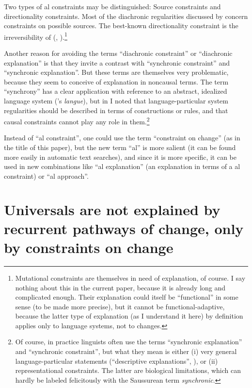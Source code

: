 \documentclass[output=paper]{langsci/langscibook}
\begin{document}
Two types of al constraints may be distinguished: Source constraints and directionality constraints. Most of the diachronic regularities discussed by \citet{Cristofaro2017} concern constraints on possible sources. The best-known directionality constraint is the irreversibility of  (\citealt{Haspelmath1999_Irrev}, \citeyear*{ Haspelmath2004_Direction}).\footnote{Mutational constraints 
\label{fn:haspelmath:mutationalconstraints}
are themselves in need of explanation, of course. I say nothing about this in the current paper, because it is already long and complicated enough. Their explanation could itself be “functional” in some sense (to be made more precise), but it cannot be functional-adaptive, because the latter type of explanation (as I understand it here) by definition applies only to language systems, not to changes.} 

Another reason for avoiding the terms “diachronic constraint” or “diachronic explanation” is that they invite a contrast with “synchronic constraint” and “synchronic explanation”. But these terms are themselves very problematic, because they seem to conceive of explanation in noncausal terms. The term “synchrony” has a clear application with reference to an abstract, idealized language system (’s \textit{langue}), but in  I noted that language-particular system regularities should be described in terms of constructions or rules, and that causal constraints cannot play any role in them.\footnote{Of course, in practice linguists often use the terms “synchronic explanation” and “synchronic constraint”, but what they mean is either (i) very general language-particular statements (“descriptive explanations”, ), or (ii) representational constraints. The latter are biological limitations, which can hardly be labeled felicitously with the Saussurean  term \textit{synchronic}.} 

Instead of “al constraint”, one could use the term “constraint on change” (as in the title of this paper), but the new term “al” is more salient (it can be found more easily in automatic text searches), and since it is more specific, it can be used in new combinations like “al explanation” (an explanation in terms of a al constraint) or “al approach”.

\section{Universals are not explained by recurrent pathways of change, only by constraints on change}\label{sec:haspelmath:4}
\end{document}
